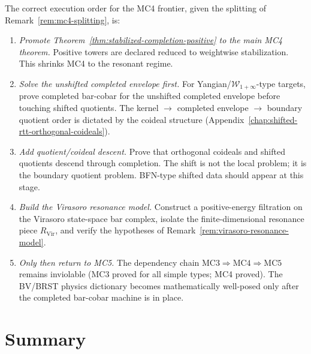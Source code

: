 \begin{remark}
\label{rem:mc4-execution-programme}
The correct execution order for the MC4 frontier, given the
splitting of Remark~\ref{rem:mc4-splitting}, is:
\begin{enumerate}
\item \emph{Promote Theorem~\textup{\ref{thm:stabilized-completion-positive}}
  to the main MC4 theorem.}
  Positive towers are declared reduced to weightwise stabilization.
  This shrinks MC4 to the resonant regime.
\item \emph{Solve the unshifted completed envelope first.}
  For Yangian/$\mathcal{W}_{1+\infty}$-type targets, prove
  completed bar-cobar for the unshifted completed envelope before
  touching shifted quotients.  The kernel
  $\to$ completed envelope $\to$ boundary quotient order is
  dictated by the coideal structure
  \textup{(}Appendix~\textup{\ref{chap:shifted-rtt-orthogonal-coideals}}\textup{)}.
\item \emph{Add quotient/coideal descent.}
  Prove that orthogonal coideals and shifted quotients descend
  through completion.  The shift is not the local problem; it is
  the boundary quotient problem.  BFN-type shifted data should
  appear at this stage.
\item \emph{Build the Virasoro resonance model.}
  Construct a positive-energy filtration on the Virasoro
  state-space bar complex, isolate the finite-dimensional
  resonance piece $R_{\mathrm{Vir}}$, and verify the hypotheses
  of Remark~\textup{\ref{rem:virasoro-resonance-model}}.
\item \emph{Only then return to MC5.}
  The dependency chain
  $\text{MC3} \Rightarrow \text{MC4} \Rightarrow \text{MC5}$
  remains inviolable (MC3 proved for all simple types; MC4 proved).  The BV/BRST physics dictionary
  becomes mathematically well-posed only after the completed
  bar-cobar machine is in place.
\end{enumerate}
\end{remark}

\section{Summary}

